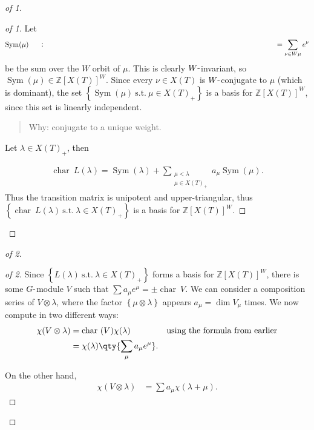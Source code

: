 \begin{proof}[of 1]

\begin{proof}[of 1]

Let
\begin{align*} \operatorname{Sym}(\mu) \mathrel{\vcenter{:}}=\sum_{\nu \in W\mu} e^\nu \end{align*}
be the sum over the \(W\) orbit of \(\mu\). This is clearly
\(W{\hbox{-}}\)invariant, so
\(\operatorname{Sym}(\mu) \in {\mathbb{Z}}[X(T)]^W\). Since every
\(\nu \in X(T)\) is \(W{\hbox{-}}\)conjugate to \(\mu\) (which is
dominant), the set
\(\left\{{\operatorname{Sym}(\mu) ~{\text{s.t.}}~\mu \in X(T)_+}\right\}\)
is a basis for \({\mathbb{Z}}[X(T)]^W\), since this set is linearly
independent.

\begin{quote}
Why: conjugate to a unique weight.
\end{quote}

Let \(\lambda \in X(T)_+\), then

\begin{align*} \operatorname{char}~L(\lambda) = \operatorname{Sym}(\lambda) + \sum_{\substack{\mu < \lambda \\ \mu \in X(T)_+} } a_\mu \operatorname{Sym}(\mu) .\end{align*}
Thus the transition matrix is unipotent and upper-triangular, thus
\(\left\{{\operatorname{char}~L(\lambda) ~{\text{s.t.}}~\lambda \in X(T)_+}\right\}\)
is a basis for \({\mathbb{Z}}[X(T)]^W\).

\end{proof}

\end{proof}

\begin{proof}[of 2]

\begin{proof}[of 2]

Since \(\left\{{L(\lambda) ~{\text{s.t.}}~\lambda\in X(T)_+}\right\}\)
forms a basis for \({\mathbb{Z}}[X(T)]^W\), there is some
\(G{\hbox{-}}\)module \(V\) such that
\(\sum a_\mu e^\mu = \pm \operatorname{char}~V\). We can consider a
composition series of \(V\otimes\lambda\), where the factor
\(\left\{{\mu \otimes\lambda}\right\}\) appears \(a_\mu = \dim V_\mu\)
times. We now compute in two different ways:
\begin{align*}   \chi(V\otimes\lambda)  &= \operatorname{char}~(V) \chi(\lambda)  && \text{using the formula from earlier} \\ &= \chi(\lambda) \qty{ \sum_\mu a_\mu e^\mu } .\end{align*}

On the other hand,
\begin{align*}   \chi(V\otimes\lambda) &= \sum a_\mu \chi(\lambda + \mu) .\end{align*}

\end{proof}

\end{proof}

